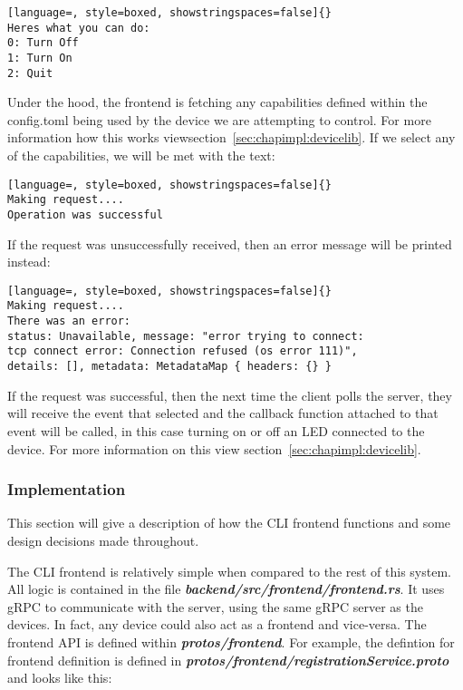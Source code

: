 \begin{lstlisting}[language=, style=boxed, showstringspaces=false]{}
Heres what you can do:
0: Turn Off
1: Turn On
2: Quit
\end{lstlisting}
Under the hood, the frontend is fetching any capabilities defined within the config.toml being used by the device we are attempting to control. For more information how this works viewsection~\ref{sec:chapimpl:devicelib}. If we select any of the capabilities, we will be met with the text:
\begin{lstlisting}[language=, style=boxed, showstringspaces=false]{}
Making request....
Operation was successful
\end{lstlisting}
If the request was unsuccessfully received, then an error message will be printed instead:
\begin{lstlisting}[language=, style=boxed, showstringspaces=false]{}
Making request....
There was an error:
status: Unavailable, message: "error trying to connect: 
tcp connect error: Connection refused (os error 111)", 
details: [], metadata: MetadataMap { headers: {} }
\end{lstlisting}
If the request was successful, then the next time the client polls the server, they will receive the event that selected and the callback function attached to that event will be called, in this case turning on or off an LED connected to the device. For more information on this view section~\ref{sec:chapimpl:devicelib}.

\subsubsection{Implementation}
This section will give a description of how the CLI frontend functions and some design decisions made throughout. 

The CLI frontend is relatively simple when compared to the rest of this system. All logic is contained in the file \textit{\textbf{backend/src/frontend/frontend.rs}}. It uses gRPC to communicate with the server, using the same gRPC server as the devices. In fact, any device could also act as a frontend and vice-versa. The frontend API is defined within \textit{\textbf{protos/frontend}}. For example, the defintion for frontend definition is defined in \textit{\textbf{protos/frontend/registrationService.proto}} and looks like this:

